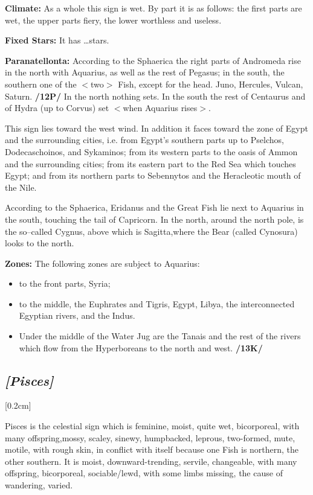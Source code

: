 \textbf{Climate:} As a whole this sign is wet. By part it is as follows: the first parts are wet, the upper parts fiery, the lower worthless and useless. 

\textbf{Fixed Stars:} It has …stars. 

\textbf{Paranatellonta:} According to the Sphaerica the right parts of Andromeda rise in the north with Aquarius, as well as the rest of Pegasus; in the south, the southern one of the $<$two$>$ Fish, except for the head. Juno, Hercules, Vulcan, Saturn. \textbf{/12P/} In the north nothing sets. In the south
the rest of Centaurus and of Hydra (up to Corvus) set $<$when Aquarius rises$>$. 

This sign lies toward the west wind. In addition it faces toward the zone of Egypt and the surrounding cities, i.e. from Egypt’s southern parts up to Pselchos, Dodecaschoinos, and Sykaminos; from its western parts to the oasis of Ammon and the surrounding cities; from its eastern part to the Red Sea which touches Egypt; and from its
northern parts to Sebennytos and the Heracleotic mouth of the Nile.

According to the Sphaerica, Eridanus and the Great Fish lie next to Aquarius in the south, touching the tail of Capricorn. In the north, around the north pole, is the so–called Cygnus, above which is Sagitta,where the Bear (called Cynosura) looks to the north. 

\textbf{Zones:} The following zones are subject to Aquarius:
\begin{itemize}
\item to the front parts, Syria; 
\item to the middle, the Euphrates and Tigris, Egypt, Libya, the interconnected Egyptian rivers, and the Indus. 
\item Under the middle of the Water Jug are the Tanais and the rest of the rivers which flow from the Hyperboreans to the north and west. \textbf{/13K/}
\end{itemize}

\secbr
\subsection{\textit{[Pisces]}}
[0.2cm]

Pisces is the celestial sign which is feminine, moist, quite wet, bicorporeal, with many offspring,mossy, scaley, sinewy, humpbacked, leprous, two-formed, mute, motile, with rough skin, in conflict with itself because one Fish is northern, the other southern. It is moist, downward-trending, servile, changeable, with many offspring, bicorporeal, sociable/lewd, with some limbs missing, the cause of wandering, varied.

